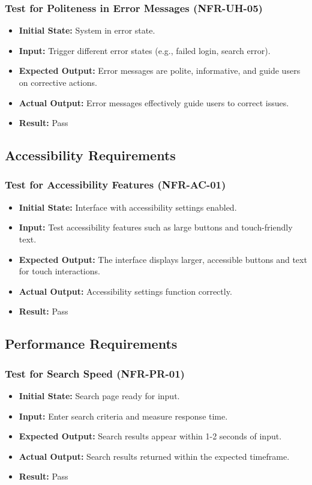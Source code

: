\documentclass[12pt, titlepage]{article}
\begin{document}
\subsubsection{Test for Politeness in Error Messages (NFR-UH-05)}
\begin{itemize}
    \item \textbf{Initial State: }System in error state.
    \item \textbf{Input: }Trigger different error states (e.g., failed login, search error).
    \item \textbf{Expected Output: }Error messages are polite, informative, and guide users on corrective actions.
    \item \textbf{Actual Output: }Error messages effectively guide users to correct issues.
    \item \textbf{Result: }Pass
\end{itemize}

\subsection{Accessibility Requirements}

\subsubsection{Test for Accessibility Features (NFR-AC-01)}
\begin{itemize}
    \item \textbf{Initial State: }Interface with accessibility settings enabled.
    \item \textbf{Input: }Test accessibility features such as large buttons and touch-friendly text.
    \item \textbf{Expected Output: }The interface displays larger, accessible buttons and text for touch interactions.
    \item \textbf{Actual Output: }Accessibility settings function correctly.
    \item \textbf{Result: }Pass
\end{itemize}

\subsection{Performance Requirements}

\subsubsection{Test for Search Speed (NFR-PR-01)}
\begin{itemize}
    \item \textbf{Initial State: }Search page ready for input.
    \item \textbf{Input: }Enter search criteria and measure response time.
    \item \textbf{Expected Output: }Search results appear within 1-2 seconds of input.
    \item \textbf{Actual Output: }Search results returned within the expected timeframe.
    \item \textbf{Result: }Pass
\end{itemize}
\end{document}
